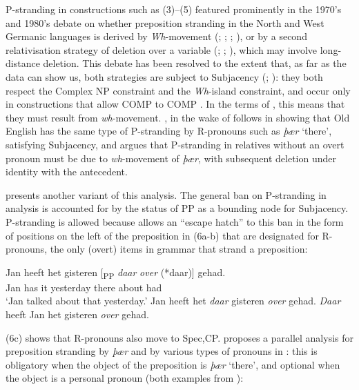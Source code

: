 \documentclass[output=paper]{langsci/langscibook}
\begin{document}
P-stranding in constructions such as (3)--(5) featured prominently in the
1970’s and 1980’s debate on whether preposition stranding in the North and West
Germanic languages is derived by \textit{Wh}-movement
(\cite{Chomsky1977,ChomskyLasnik1977}; \cite[286--297]{vanRiemsdijk1978};
\citealt{Vat1978}; \citealt{vanKemenade1987}), or by a second relativisation
strategy of deletion over a variable (\citealt{Maling1976};
\citealt{BresnanGrimshaw1978}; \citealt{Allen1977,Allen1980}), which may
involve long-distance deletion. This debate has been resolved to the extent
that, as far as the data can show us, both strategies are subject to Subjacency
(\citealt{Allen1980}; \citealt{vanKemenade1987}): they both respect the Complex
NP constraint and the \textit{Wh}-island constraint, and occur only in
constructions that allow COMP to COMP . In the terms of
\textcite{Chomsky1977,ChomskyLasnik1977}, this means that they must result from
\textit{wh}-movement. \citet{Vat1978}, in the wake of
\citet{vanRiemsdijk1978} follows \citet{Allen1977} in showing that Old English
has the same type of P-stranding by R-pronouns such
as \textit{þær} ‘there’, satisfying Subjacency, and argues that
P-stranding in relatives without an overt pronoun
must be due to \textit{wh}-movement of \textit{þær}, with subsequent deletion
under identity with the antecedent.

 presents another variant of this analysis. The general
ban on P-stranding in  analysis is accounted for by
the status of PP as a bounding node for Subjacency.  P-stranding is
allowed because  allows an “escape hatch” to this ban in the form of
positions on the left of the preposition in (6a-b) that are designated for
R-pronouns, the only (overt) items in  grammar that strand a preposition:

\ea%
    \label{ex:key:11.6}
    	\ea
	\gll Jan heeft het gisteren [\textsubscript{PP} \textit{daar} \textit{over} (*daar)] gehad.\\
        		Jan has    it   yesterday {}    there  about   {}         had\\
	\glt ‘Jan talked about that yesterday.’
	\ex Jan heeft het \textit{daar} gisteren \textit{over} gehad.
	\ex \textit{Daar} heeft Jan het gisteren \textit{over} gehad.
	\z
\z

(6c) shows that R-pronouns also move to Spec,CP. 
proposes a parallel analysis for preposition stranding by \textit{þær} and by
various types of pronouns in : this is obligatory when the object of
the preposition is \textit{þær} ‘there’, and optional when the object is a
personal pronoun (both examples from
\citealt[117]{vanKemenade1987}):\newpage
\end{document}
